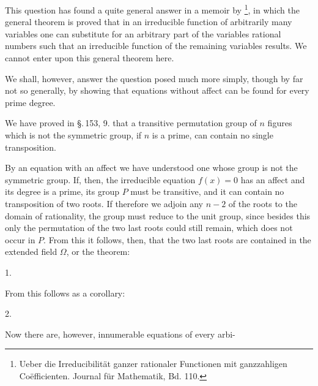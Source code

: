 
This question has found a quite general answer in a memoir by \footnote{Ueber die Irreducibilit\"at ganzer rationaler Functionen mit ganzzahligen Co\"efficienten. Journal f\"ur Mathematik, Bd. 110.}, in which the general theorem is proved that in an irreducible function of arbitrarily many variables one can substitute for an arbitrary part of the variables rational numbers such that an irreducible function of the remaining variables results. We cannot enter upon this general theorem here.

We shall, however, answer the question posed much more simply, though by far not so generally, by showing that equations without affect can be found for every prime degree.

We have proved in \S.\,153, 9. that a transitive permutation group of $n$ figures which is not the symmetric group, if $n$ is a prime, can contain no single transposition.

By an equation with an affect we have understood one whose group is not the symmetric group. If, then, the irreducible equation $f(x) = 0$ has an affect and its degree is a prime, its group $P$ must be transitive, and it can contain no transposition of two roots. If therefore we adjoin any $n - 2$ of the roots to the domain of rationality, the group must reduce to the unit group, since besides this only the permutation of the two last roots could still remain, which does not occur in $P$. From this it follows, then, that the two last roots are contained in the extended field $\Omega$, or the theorem:

1. 

From this follows as a corollary:

2. 

Now there are, however, innumerable equations of every arbi-
